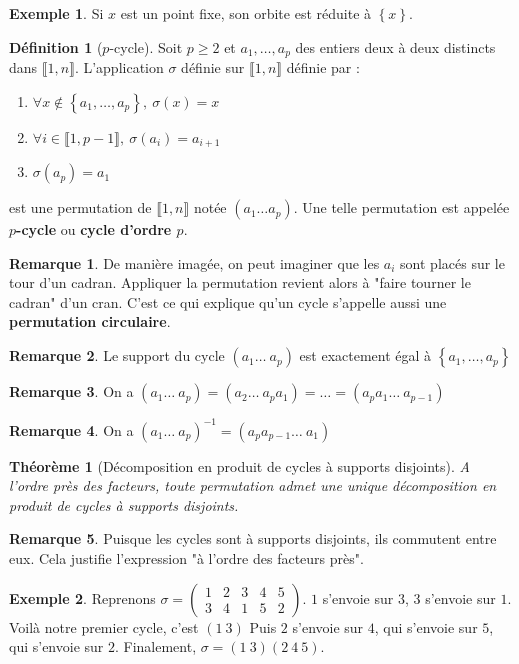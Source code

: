 \documentclass[french]{book}
\newcommand{\inv}{^{-1}}
\theoremstyle{plain}
\newtheorem{thm}{Théorème}[chapter]
\theoremstyle{definition}
\newtheorem{dfn}{Définition}[chapter]
\newtheorem{exa}{Exemple}[chapter]
\newtheorem{rmq}{Remarque}[chapter]
\theoremstyle{remark}
\begin{document}
\begin{exa}
	Si $x$ est un point fixe, son orbite est réduite à $\left\{x\right\}$.
\end{exa}
\begin{dfn}[$p$-cycle]
	Soit $p\geqslant 2$ et $a_1,\ldots,a_p$ des entiers deux à deux distincts dans $\llbracket1,n\rrbracket$. L'application $\sigma$ définie sur $\llbracket1,n\rrbracket$ définie par :
	\begin{enumerate}
		\item $\forall x \notin\left\{a_1,\ldots,a_p\right\},\ \sigma(x)=x$
		\item $\forall i\in\llbracket1,p-1\rrbracket,\ \sigma(a_i)=a_{i+1}$
		\item $\sigma(a_p)=a_1$
	\end{enumerate}
	est une permutation de $\llbracket1,n\rrbracket$ notée $(a_1 \ldots a_p)$. Une telle permutation est appelée \textbf{$p$-cycle} ou \textbf{cycle d'ordre $p$}.
\end{dfn}
\begin{rmq}De manière imagée, on peut imaginer que les $a_i$ sont placés sur le tour d'un cadran. Appliquer la permutation revient alors à "faire tourner le cadran" d'un cran. C'est ce qui explique qu'un cycle s'appelle aussi une \textbf{permutation circulaire}.  \end{rmq} 
\begin{rmq} Le support du cycle $(a_1 \ldots \ a_p)$ est exactement égal à $\left\{a_1,\ldots,a_p\right\}$  \end{rmq} 
\begin{rmq} On a $(a_1\ldots \ a_p)=(a_2\ldots \ a_p a_1)=\ldots=(a_p a_1\ldots \ a_{p-1})$ \end{rmq}
\begin{rmq}  On a $(a_1\ldots \ a_p)\inv=(a_p a_{p-1}\ldots \ a_1)$ \end{rmq}
\begin{thm}[Décomposition en produit de cycles à supports disjoints]
	A l'ordre près des facteurs, toute permutation admet une unique décomposition en produit de cycles à supports disjoints.
\end{thm}
\begin{rmq} Puisque les cycles sont à supports disjoints, ils commutent entre eux. Cela justifie l'expression "à l'ordre des facteurs près". \end{rmq}
\begin{exa}
	Reprenons $\displaystyle \sigma =\begin{pmatrix}1&2&3&4&5\\3&4&1&5&2\end{pmatrix}$. $1$ s'envoie sur $3$, $3$ s'envoie sur $1$. Voilà notre premier cycle, c'est $(1\ 3)$ Puis $2$ s'envoie sur $4$, qui s'envoie sur $5$, qui s'envoie sur $2$. Finalement, $\sigma=(1\ 3)(2\ 4\ 5)$.
\end{exa}
\end{document}
